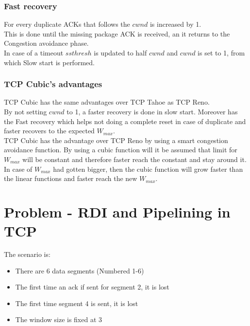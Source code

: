 \documentclass[12pt, a4paper]{article}
\begin{document}
			\subsubsection{Fast recovery}
				For every duplicate ACKs that follows the $cwnd$ is increased by 1.\\
				This is done until the missing package ACK is received, an it returns to the Congestion avoidance phase.\\
				In case of a timeout $ssthresh$ is updated to half $cwnd$ and $cwnd$ is set to 1, from which Slow start is performed.
			\subsubsection{TCP Cubic's advantages}
				TCP Cubic has the same advantages over TCP Tahoe as TCP Reno.\\
				By not setting $cwnd$ to 1, a faster recovery is done in slow start. Moreover has the Fast recovery which helps not doing a complete reset in case of duplicate and faster recovers to the expected $W_{max}$.\\
				TCP Cubic has the advantage over TCP Reno by using a smart congestion avoidance function. By using a cubic function will it be assumed that limit for $W_{max}$ will be constant and therefore faster reach the constant and stay around it. In case of $W_{max}$ had gotten bigger, then the cubic function will grow faster than the linear functions and faster reach the new $W_{max}$.
	\section{Problem - RDI and Pipelining in TCP}
		The scenario is:
		\begin{itemize}
			\item There are 6 data segments (Numbered 1-6)
			\item The first time an ack if sent for segment 2, it is lost
			\item The first time segment 4 is sent, it is lost
			\item The window size is fixed at 3
		\end{itemize}
\end{document}
